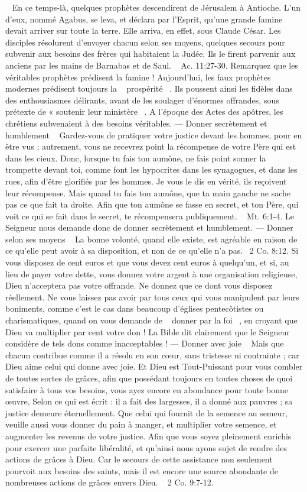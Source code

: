 \begin{multicols}{2}
{~ En ce temps-là, quelques prophètes descendirent de Jérusalem à Antioche. L’un d'eux, nommé Agabus, se leva, et déclara par l'Esprit, qu'une grande famine devait arriver sur toute la terre. Elle arriva, en effet, sous Claude César. 
Les disciples résolurent d’envoyer chacun selon ses moyens, quelques secours pour subvenir aux besoins des frères qui habitaient la Judée. Ils le firent parvenir aux anciens par les mains de Barnabas et de Saul. ~ Ac. 11:27-30. Remarquez que les véritables prophètes prédisent la famine ! Aujourd’hui, les faux prophètes modernes prédisent toujours la ~ prospérité ~. Ils poussent ainsi les fidèles dans des enthousiasmes délirants, avant de les soulager d’énormes 
offrandes, sous prétexte de « soutenir leur ministère ~. A l’époque des Actes des apôtres, les chrétiens subvenaient à des besoins véritables.
— Donner secrètement et humblement
~ Gardez-vous de pratiquer votre justice devant les hommes, pour en être vus ; autrement, vous ne recevrez point la récompense de votre Père qui est dans les cieux. Donc, lorsque tu fais ton aumône, ne fais point sonner la trompette 
devant toi, comme font les hypocrites dans les synagogues, et dans les rues, afin d’être glorifiés par les hommes. Je vous le dis en vérité, ils reçoivent leur récompense. Mais quand tu fais ton aumône, que ta main gauche ne sache pas ce que fait ta droite. Afin que ton aumône se fasse en secret, et ton Père, qui voit ce qui se fait dans le secret, te récompensera publiquement. ~ Mt. 6:1-4.
Le Seigneur nous demande donc de donner secrètement et humblement.
— Donner selon ses moyens
~ La bonne volonté, quand elle existe, est agréable en raison de ce qu’elle peut avoir à sa disposition, et non de ce qu’elle n’a pas.~ 2 Co. 8:12.
Si vous disposez de cent euros et que vous devez cent euros à quelqu’un, et si, au lieu de payer votre dette, vous donnez votre argent à une organisation religieuse, Dieu n’acceptera pas votre offrande. Ne donnez que ce dont vous disposez réellement. Ne vous laissez pas avoir par tous ceux qui vous manipulent par leurs boniments, comme c’est le cas dans beaucoup d’églises pentecôtistes ou charismatiques, quand on vous demande de ~ donner par la foi ~, en croyant que Dieu va multiplier par cent votre don ! La Bible dit clairement que le Seigneur considère de tels dons comme inacceptables !
— Donner avec joie
~ Mais que chacun contribue comme il a résolu en son cœur, sans tristesse ni contrainte ; car Dieu aime celui qui donne avec joie. Et Dieu est Tout-Puissant pour vous combler de toutes sortes de grâces, afin que possédant toujours en toutes choses de quoi satisfaire à tous vos besoins, vous ayez encore en abondance pour toute bonne œuvre, Selon ce qui est écrit : il a fait des largesses, il a donné aux pauvres ; sa justice demeure éternellement. Que celui qui fournit de la semence au semeur, veuille aussi vous donner du pain à manger, et multiplier votre semence, et augmenter les revenus de votre justice. Afin que vous soyez pleinement enrichis pour exercer une parfaite libéralité, et qu’ainsi nous ayons sujet de rendre des actions de grâces à Dieu. Car le secours de cette assistance non seulement pourvoit aux besoins des saints, mais il est encore une source abondante de nombreuses actions de grâces envers Dieu. ~ 2 Co. 9:7-12.
}
\end{multicols}
